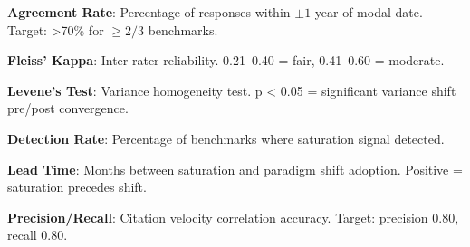 
\textbf{Agreement Rate}: Percentage of responses within $\pm 1$ year of modal date. Target: >70\% for $\geq 2/3$ benchmarks.

\textbf{Fleiss' Kappa}: Inter-rater reliability. 0.21--0.40 = fair, 0.41--0.60 = moderate.

\textbf{Levene's Test}: Variance homogeneity test. p < 0.05 = significant variance shift pre/post convergence.

\textbf{Detection Rate}: Percentage of benchmarks where saturation signal detected.

\textbf{Lead Time}: Months between saturation and paradigm shift adoption. Positive = saturation precedes shift.

\textbf{Precision/Recall}: Citation velocity correlation accuracy. Target: precision 0.80, recall 0.80.
